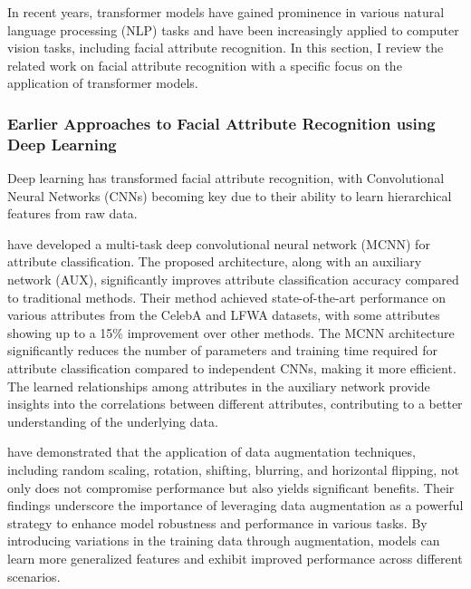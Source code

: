 \documentclass[a4paper,oneside]{article}
\begin{document}
In recent years, transformer models have gained prominence in various natural language processing (NLP) tasks and have been increasingly applied to computer vision tasks, including facial attribute recognition. In this section, I review the related work on facial attribute recognition with a specific focus on the application of transformer models.
\subsubsection{Earlier Approaches to Facial Attribute Recognition using Deep Learning}
\label{sec:earlier_approaches}
Deep learning has transformed facial attribute recognition, with Convolutional Neural Networks (CNNs) becoming key due to their ability to learn hierarchical features from raw data.

\citet{DBLP:journals/corr/HandC16} have developed a multi-task deep convolutional neural network (MCNN) for attribute classification.
The proposed architecture, along with an auxiliary network (AUX), significantly improves attribute classification accuracy compared to traditional methods.
Their method achieved state-of-the-art performance on various attributes from the CelebA and LFWA datasets, with some attributes showing up to a 15\% improvement over other methods.
The MCNN architecture significantly reduces the number of parameters and training time required for attribute classification compared to independent CNNs, making it more efficient.
The learned relationships among attributes in the auxiliary network provide insights into the correlations between different attributes, contributing to a better understanding of the underlying data.

\citet{DBLP:journals/corr/GuntherRB16} have demonstrated that the application of data augmentation techniques, including random scaling, rotation, shifting, blurring, and horizontal flipping, not only does not compromise performance but also yields significant benefits.
Their findings underscore the importance of leveraging data augmentation as a powerful strategy to enhance model robustness and performance in various tasks.
By introducing variations in the training data through augmentation, models can learn more generalized features and exhibit improved performance across different scenarios.
\end{document}
